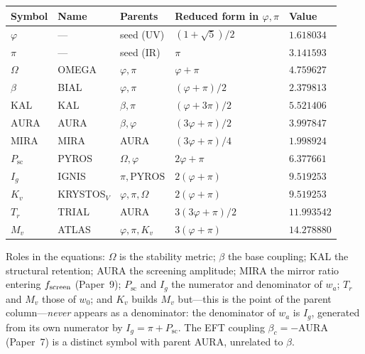 \documentclass[a4paper,11pt]{article}
\begin{document}
\begin{center}
\begin{tabular}{lllll}
\toprule
Symbol & Name & Parents & Reduced form in $\varphi,\pi$ & Value \\
\midrule
$\varphi$   & ---               & seed (UV)              & $(1+\sqrt5)/2$              & $1.618034$  \\
$\pi$       & ---               & seed (IR)              & $\pi$                       & $3.141593$  \\
$\Omega$    & OMEGA             & $\varphi,\pi$          & $\varphi+\pi$               & $4.759627$  \\
$\beta$     & BIAL              & $\varphi,\pi$          & $(\varphi+\pi)/2$           & $2.379813$  \\
$\mathrm{KAL}$  & KAL           & $\beta,\pi$            & $(\varphi+3\pi)/2$          & $5.521406$  \\
$\mathrm{AURA}$ & AURA          & $\beta,\varphi$        & $(3\varphi+\pi)/2$          & $3.997847$  \\
$\mathrm{MIRA}$ & MIRA          & AURA                   & $(3\varphi+\pi)/4$          & $1.998924$  \\
$P_{\mathrm{sc}}$ & PYROS       & $\Omega,\varphi$       & $2\varphi+\pi$              & $6.377661$  \\
$I_g$       & IGNIS             & $\pi,\mathrm{PYROS}$   & $2(\varphi+\pi)$            & $9.519253$  \\
$K_v$       & KRYSTOS$_V$       & $\varphi,\pi,\Omega$   & $2(\varphi+\pi)$            & $9.519253$  \\
$T_r$       & TRIAL             & AURA                   & $3(3\varphi+\pi)/2$         & $11.993542$ \\
$M_v$       & ATLAS             & $\varphi,\pi,K_v$      & $3(\varphi+\pi)$            & $14.278880$ \\
\bottomrule
\end{tabular}
\end{center}

\noindent Roles in the equations: $\Omega$ is the stability metric; $\beta$ the
base coupling; KAL the structural retention; AURA the screening amplitude; MIRA
the mirror ratio entering $f_{\rm screen}$ (Paper~9); $P_{\mathrm{sc}}$ and $I_g$
the numerator and denominator of $w_a$; $T_r$ and $M_v$ those of $w_0$; and $K_v$
builds $M_v$ but---this is the point of the parent column---\emph{never} appears
as a denominator: the denominator of $w_a$ is $I_g$, generated from its own
numerator by $I_g=\pi+P_{\mathrm{sc}}$. The EFT coupling $\beta_c=-\mathrm{AURA}$
(Paper~7) is a distinct symbol with parent AURA, unrelated to $\beta$.
\end{document}
